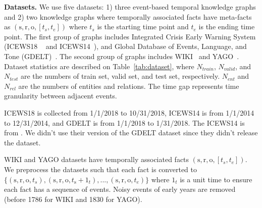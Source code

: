 \documentclass[11pt,a4paper]{article}
\newcommand{\para}[1]{\smallskip\noindent\textbf{#1}}
\newcommand{\bs}{\mathrm{s}}
\newcommand{\br}{\mathrm{r}}
\newcommand{\bo}{\mathrm{o}}
\begin{document}
\para{Datasets.}
\label{append:dataset}
We use five datasets: 1) three event-based temporal knowledge graphs and 2) two knowledge graphs where temporally associated facts have meta-facts as $(\bs,\br,\bo, [t_s, t_e])$ where $t_s$ is the starting time point and $t_e$ is the ending time point. 
The first group of graphs includes Integrated Crisis Early Warning System (ICEWS18 ~\citep{boschee2015icews} and ICEWS14~\citep{Trivedi2017KnowEvolveDT}), and Global Database of Events, Language, and Tone (GDELT)~\citep{leetaru2013gdelt}.
The second group of graphs includes WIKI~\citep{leblay2018deriving} and YAGO~\citep{Mahdisoltani2014YAGO3AK}.
Dataset statistics are described on Table~\ref{tab:dataset}, where $N_{train}$, $N_{valid}$, and $N_{test}$ are the numbers of train set, valid set, and test set, respectively. $N_{ent}$ and $N_{rel}$ are the numbers of entities and relations. The time gap represents time granularity between adjacent events. 


ICEWS18 is collected from 1/1/2018 to 10/31/2018, ICEWS14 is from 1/1/2014 to 12/31/2014, and GDELT is from 1/1/2018 to 1/31/2018.
The ICEWS14 is from \citep{Trivedi2017KnowEvolveDT}. We didn't use their version of the GDELT dataset since they didn't release the dataset.



WIKI and YAGO datasets have temporally associated facts $(\bs,\br,\bo, \allowbreak [t_s, t_e])$.
We preprocess the datasets such that each fact is converted to $\{(\bs,\br,\bo, t_s), (\bs,\br,\bo,t_\bs+1_t),...,(\bs,\br,\bo,t_e)\}$ where $1_t$ is a unit time to ensure each fact has a sequence of events. Noisy events of early years are removed (before 1786 for WIKI and 1830 for YAGO). 
\end{document}
